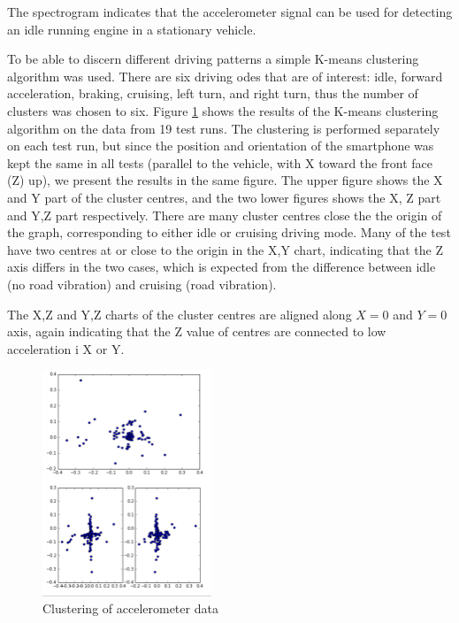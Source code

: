 \documentclass[conference]{IEEEtran}
\begin{document}
The spectrogram indicates that the accelerometer signal can be used for detecting an idle running engine in a stationary vehicle.

To be able to discern different driving patterns a simple K-means clustering algorithm was used. There are six driving odes that are of interest: idle, forward acceleration, braking, cruising, left turn, and right turn, thus the number of clusters was chosen to six. Figure \ref{cluster} shows the results of the K-means clustering algorithm on the data from 19 test runs. The clustering is performed separately on each test run, but since the position and orientation of the smartphone was kept the same in all tests (parallel to the vehicle, with X toward the front face (Z) up), we present the results in the same figure. The upper figure shows the X and Y part of the cluster centres, and the two lower figures shows the X, Z part and Y,Z part respectively. There are many cluster centres close the the origin of the graph, corresponding to either idle or cruising driving mode. Many of the test have two centres at or close to the origin in the X,Y chart, indicating that the Z axis differs in the two cases, which is expected from the difference between idle (no road vibration) and cruising (road vibration).

The X,Z and Y,Z charts of the cluster centres are aligned along $X=0$ and $Y=0$ axis, again indicating that the Z value of centres are connected to low acceleration i X or Y.
\begin{figure}[h]
  	\centering
  	\includegraphics[width=0.45\textwidth]
  	{cluster_acc}
  \caption{Clustering of accelerometer data}
  \label{cluster}
\end{figure}
\end{document}
